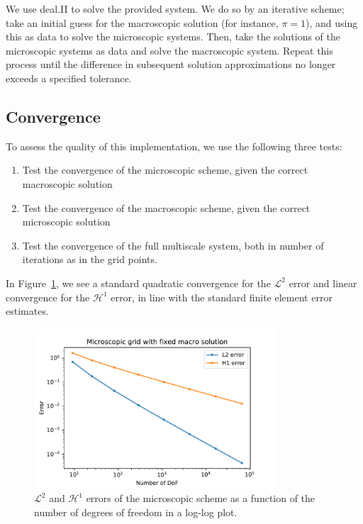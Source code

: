\documentclass{article}
\renewcommand{\L}{\mathcal{ L}}
\renewcommand{\H}{\mathcal{ H}}
\begin{document}
We use deal.II to solve the provided system. We do so by an iterative scheme; take an initial guess for the macroscopic solution (for instance, $\pi=1$), and using this as data to solve the microscopic systems.
Then, take the solutions of the microscopic systems as data and solve the macroscopic system.
Repeat this process until the difference in subsequent solution approximations no longer exceeds a specified tolerance.

\subsection{Convergence}
To assess the quality of this implementation, we use the following three tests:
\begin{enumerate}
    \item Test the convergence of the microscopic scheme, given the correct macroscopic solution
    \item Test the convergence of the macroscopic scheme, given the correct microscopic solution
    \item Test the convergence of the full multiscale system, both in number of iterations as in the grid points.
\end{enumerate}

In Figure~\ref{fig:micro_convergence}, we see a standard quadratic convergence for the $\L^2$ error and linear convergence for the $\H^1$ error, in line with the standard finite element error estimates.

\begin{figure}[ht]
    \centering
    \includegraphics[width=0.8\textwidth]{micro_convergence.pdf}
    \caption{$\L^2$ and $\H^1$ errors of the microscopic scheme as a function of the number of degrees of freedom in a log-log plot.}
    \label{fig:micro_convergence}
\end{figure}
\end{document}
